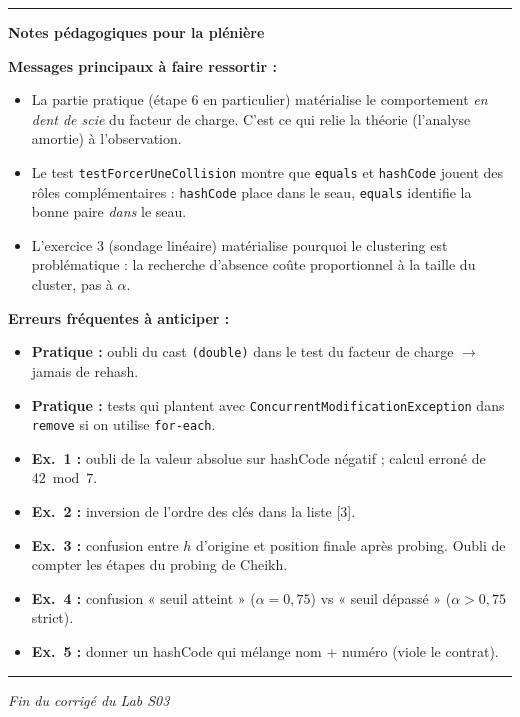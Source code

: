 \documentclass[10pt,a4paper]{article}
\begin{document}
\vspace{0.4cm}
\hrule
\vspace{0.3cm}


\textbf{\large Notes pédagogiques pour la plénière}

\vspace{0.15cm}

\textbf{Messages principaux à faire ressortir :}
\begin{itemize}[leftmargin=1.5em,itemsep=0pt]
\item La partie pratique (étape 6 en particulier) matérialise le comportement \emph{en dent de scie} du facteur de charge. C'est ce qui relie la théorie (l'analyse amortie) à l'observation.
\item Le test \texttt{testForcerUneCollision} montre que \texttt{equals} et \texttt{hashCode} jouent des rôles complémentaires : \texttt{hashCode} place dans le seau, \texttt{equals} identifie la bonne paire \emph{dans} le seau.
\item L'exercice 3 (sondage linéaire) matérialise pourquoi le clustering est problématique : la recherche d'absence coûte proportionnel à la taille du cluster, pas à $\alpha$.
\end{itemize}

\medskip

\textbf{Erreurs fréquentes à anticiper :}
\begin{itemize}[leftmargin=1.5em,itemsep=0pt]
\item \textbf{Pratique :} oubli du cast \texttt{(double)} dans le test du facteur de charge $\to$ jamais de rehash.
\item \textbf{Pratique :} tests qui plantent avec \texttt{ConcurrentModificationException} dans \texttt{remove} si on utilise \texttt{for-each}.
\item \textbf{Ex.~1 :} oubli de la valeur absolue sur hashCode négatif ; calcul erroné de $42 \bmod 7$.
\item \textbf{Ex.~2 :} inversion de l'ordre des clés dans la liste [3].
\item \textbf{Ex.~3 :} confusion entre $h$ d'origine et position finale après probing. Oubli de compter les étapes du probing de Cheikh.
\item \textbf{Ex.~4 :} confusion « seuil atteint » ($\alpha = 0{,}75$) vs « seuil dépassé » ($\alpha > 0{,}75$ strict).
\item \textbf{Ex.~5 :} donner un hashCode qui mélange nom + numéro (viole le contrat).
\end{itemize}

\vspace{0.3cm}
\hrule
\vspace{0.1cm}

\begin{center}
{\small\textit{Fin du corrigé du Lab S03}}
\end{center}
\end{document}

